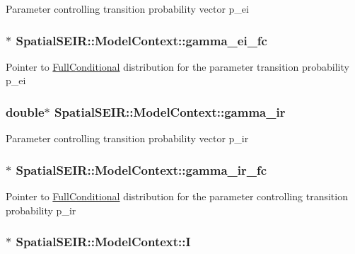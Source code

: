Parameter controlling transition probability vector p\-\_\-ei \hypertarget{classSpatialSEIR_1_1ModelContext_a6973164c7a807aea76f3bab1f4403cd5}{
\subsubsection[{gamma\-\_\-ei\-\_\-fc}]{$\ast$ Spatial\-S\-E\-I\-R\-::\-Model\-Context\-::gamma\-\_\-ei\-\_\-fc}}\label{classSpatialSEIR_1_1ModelContext_a6973164c7a807aea76f3bab1f4403cd5}
Pointer to \hyperlink{classSpatialSEIR_1_1FullConditional}{Full\-Conditional} distribution for the parameter transition probability p\-\_\-ei \hypertarget{classSpatialSEIR_1_1ModelContext_a9cbe4ffa8f5b19740f7cffc37d1a7b3c}{
\subsubsection[{gamma\-\_\-ir}]{\setlength{\rightskip}{0pt plus 5cm}double$\ast$ Spatial\-S\-E\-I\-R\-::\-Model\-Context\-::gamma\-\_\-ir}}\label{classSpatialSEIR_1_1ModelContext_a9cbe4ffa8f5b19740f7cffc37d1a7b3c}
Parameter controlling transition probability vector p\-\_\-ir \hypertarget{classSpatialSEIR_1_1ModelContext_a9293a2cef5007f0f4510072fb3babbf1}{
\subsubsection[{gamma\-\_\-ir\-\_\-fc}]{$\ast$ Spatial\-S\-E\-I\-R\-::\-Model\-Context\-::gamma\-\_\-ir\-\_\-fc}}\label{classSpatialSEIR_1_1ModelContext_a9293a2cef5007f0f4510072fb3babbf1}
Pointer to \hyperlink{classSpatialSEIR_1_1FullConditional}{Full\-Conditional} distribution for the parameter controlling transition probability p\-\_\-ir \hypertarget{classSpatialSEIR_1_1ModelContext_aa68b54ddf89a3ea432433dfb09c7983f}{
\subsubsection[{I}]{$\ast$ Spatial\-S\-E\-I\-R\-::\-Model\-Context\-::\-I}}\label{classSpatialSEIR_1_1ModelContext_aa68b54ddf89a3ea432433dfb09c7983f}
